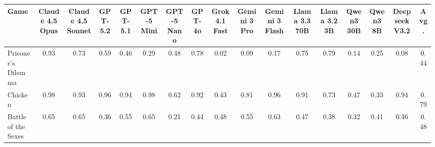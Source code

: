 
\begin{table}[htbp]
\centering
\renewcommand{\arraystretch}{2}
\footnotesize
\begin{adjustbox}{max width=\textwidth}
\begin{tabular}{lccccccccccccccc|c}
\toprule
\textbf{Game} & \textbf{\scriptsize Claude 4.5 Opus} & \textbf{\scriptsize Claude 4.5 Sonnet} & \textbf{\scriptsize GPT-5.2} & \textbf{\scriptsize GPT-5.1} & \textbf{\scriptsize GPT-5 Mini} & \textbf{\scriptsize GPT-5 Nano} & \textbf{\scriptsize GPT-4o} & \textbf{\scriptsize Grok 4.1 Fast} & \textbf{\scriptsize Gemini 3 Pro} & \textbf{\scriptsize Gemini 3 Flash} & \textbf{\scriptsize Llama 3.3 70B} & \textbf{\scriptsize Llama 3.2 3B} & \textbf{\scriptsize Qwen3 30B} & \textbf{\scriptsize Qwen3 8B} & \textbf{\scriptsize Deepseek V3.2} & \textbf{\scriptsize Avg.} \\
\midrule
Prisoner's Dilemma & \cellcolor[HTML]{38A55E}0.93 & \cellcolor[HTML]{95CF8B}0.73 & \cellcolor[HTML]{D6ECAB}0.59 & \cellcolor[HTML]{FBEEB3}0.46 & \cellcolor[HTML]{EEA77E}0.29 & \cellcolor[HTML]{FDF8BA}0.48 & \cellcolor[HTML]{7EC580}0.78 & \cellcolor[HTML]{D8392D}0.02 & \cellcolor[HTML]{DD5441}0.09 & \cellcolor[HTML]{E4785B}0.17 & \cellcolor[HTML]{8ECC88}0.75 & \cellcolor[HTML]{7AC37E}0.79 & \cellcolor[HTML]{E26B52}0.14 & \cellcolor[HTML]{EA9571}0.25 & \cellcolor[HTML]{DD513F}0.08 & \cellcolor[HTML]{F9E4AB}0.44 \\
Chicken & \cellcolor[HTML]{219B53}0.98 & \cellcolor[HTML]{39A65F}0.93 & \cellcolor[HTML]{2DA059}0.96 & \cellcolor[HTML]{37A55E}0.94 & \cellcolor[HTML]{239C54}0.98 & \cellcolor[HTML]{C6E5A3}0.62 & \cellcolor[HTML]{3FA862}0.92 & \cellcolor[HTML]{F9E3AA}0.43 & \cellcolor[HTML]{6FBE79}0.81 & \cellcolor[HTML]{2A9F57}0.96 & \cellcolor[HTML]{44AB64}0.91 & \cellcolor[HTML]{96D08C}0.73 & \cellcolor[HTML]{FCF2B6}0.47 & \cellcolor[HTML]{F1B689}0.33 & \cellcolor[HTML]{34A35C}0.94 & \cellcolor[HTML]{78C27D}0.79 \\
Battle of the Sexes & \cellcolor[HTML]{BADF9D}0.65 & \cellcolor[HTML]{BAE09D}0.65 & \cellcolor[HTML]{F4C695}0.36 & \cellcolor[HTML]{E7F4B3}0.55 & \cellcolor[HTML]{B9DF9D}0.65 & \cellcolor[HTML]{E88868}0.21 & \cellcolor[HTML]{FAE6AD}0.44 & \cellcolor[HTML]{FDF6B8}0.48 & \cellcolor[HTML]{E6F4B3}0.55 & \cellcolor[HTML]{C1E3A1}0.63 & \cellcolor[HTML]{FCF2B6}0.47 & \cellcolor[HTML]{F5CC99}0.38 & \cellcolor[HTML]{F0B589}0.32 & \cellcolor[HTML]{F7DAA3}0.41 & \cellcolor[HTML]{FBEDB2}0.46 & \cellcolor[HTML]{FDF7B9}0.48 \\

\end{tabular}
\end{adjustbox}
\end{table}
